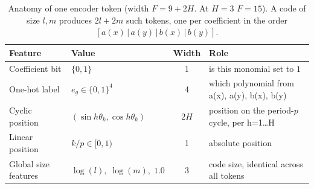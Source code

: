 \begin{table}[t]
  \centering
  \caption{Anatomy of one encoder token (width \(F = 9 + 2H\). At \(H=3\) \(F=15\)). A code
  of size \(l,m\) produces \(2l+2m\) such tokens, one per coefficient in the order
  \([a(x)\,|\,a(y)\,|\,b(x)\,|\,b(y)]\).}
  \label{tab:token-features}
  \footnotesize
  \begin{tabular}{llcl}
    \toprule
    Feature & Value & Width & Role \\
    \midrule
    Coefficient bit & \(\{0,1\}\) & 1 & is this monomial set to \(1\) \\
    One-hot label & \(e_g \in \{0,1\}^4\) & 4 & which polynomial from a(x), a(y), b(x), b(y)\\
    Cyclic position & \((\sin h\theta_k, \cos h\theta_k)\) & \(2H\) & position on the period-\(p\) cycle, per h=1\ldots H \\
    Linear position & \(k/p \in [0,1)\) & 1 & absolute position\\ %
    Global size features & \(\log(l),\; \log(m),\; 1.0\) & 3 & code size, identical across all tokens \\
    \bottomrule
  \end{tabular}
\end{table}
  

